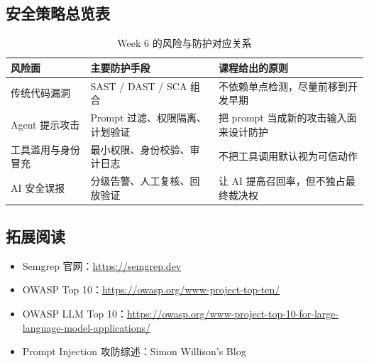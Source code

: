\documentclass[a4paper]{article}
\begin{document}
\subsection{安全策略总览表}

\begin{table}[H]
\centering
\begin{tabular}{p{} p{} p{}}
\toprule
风险面 & 主要防护手段 & 课程给出的原则 \\
\midrule
传统代码漏洞 & SAST / DAST / SCA 组合 & 不依赖单点检测，尽量前移到开发早期 \\
Agent 提示攻击 & Prompt 过滤、权限隔离、计划验证 & 把 prompt 当成新的攻击输入面来设计防护 \\
工具滥用与身份冒充 & 最小权限、身份校验、审计日志 & 不把工具调用默认视为可信动作 \\
AI 安全误报 & 分级告警、人工复核、回放验证 & 让 AI 提高召回率，但不独占最终裁决权 \\
\bottomrule
\end{tabular}
\caption{Week 6 的风险与防护对应关系}
\end{table}

\subsection{拓展阅读}

\begin{itemize}
    \item Semgrep 官网：\url{https://semgrep.dev}
    \item OWASP Top 10：\url{https://owasp.org/www-project-top-ten/}
    \item OWASP LLM Top 10：\url{https://owasp.org/www-project-top-10-for-large-language-model-applications/}
    \item Prompt Injection 攻防综述：Simon Willison's Blog
\end{itemize}

\end{document}
